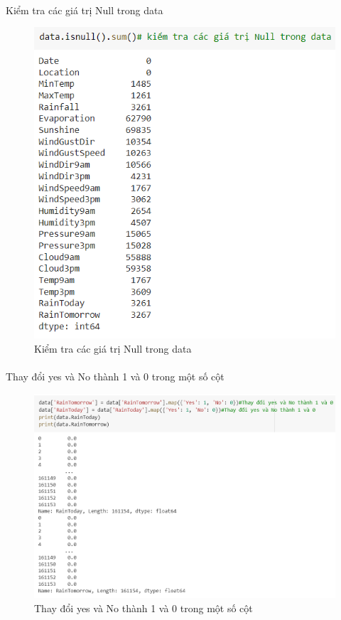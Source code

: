 \documentclass{article}
\begin{document}
\paragraph{}Kiểm tra các giá trị Null trong data
\begin{figure}[!h]
	\begin{center}
		\includegraphics[width=\linewidth]{images/code8.png}
		\caption{\fontsize{14}{20}\selectfont Kiểm tra các giá trị Null trong data}
	\end{center}
\end{figure}
\pagebreak
\paragraph{}Thay đổi yes và No thành 1 và 0 trong một số cột
\begin{figure}[!h]
	\begin{center}
		\includegraphics[width=\linewidth]{images/code13.png}
		\caption{\fontsize{14}{20}\selectfont Thay đổi yes và No thành 1 và 0 trong một số cột}
	\end{center}
\end{figure}
\pagebreak
\end{document}
